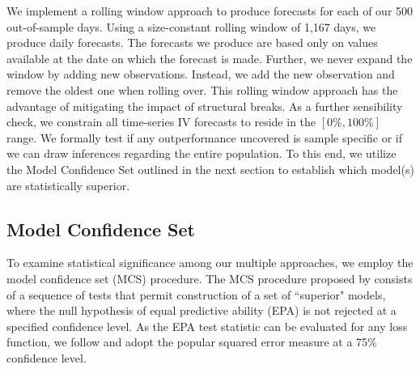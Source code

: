 \documentclass[12pt,a4paper]{article}
\begin{document}
We implement a rolling window approach to produce forecasts for each of our 500 out-of-sample days. Using a size-constant rolling window of 1,167 days, we produce daily forecasts. The forecasts we produce are based only on values available at the date on which the forecast is made. Further, we never expand the window by adding new observations. Instead, we add the new observation and remove the oldest one when rolling over. This rolling window approach has the advantage of mitigating the impact of structural breaks. As a further sensibility check, we constrain all time-series IV forecasts to reside in the $[0\%,100\%]$ range. We formally test if any outperformance uncovered is sample specific or if we can draw inferences regarding the entire population. To this end, we utilize the Model Confidence Set outlined in the next section to establish which model(s) are statistically superior.

\subsection{Model Confidence Set}

To examine statistical significance among our multiple approaches, we employ the model confidence set (MCS) procedure. The MCS procedure proposed by \cite{HLN11} consists of a sequence of tests that permit construction of a set of ``superior" models, where the null hypothesis of equal predictive ability (EPA) is not rejected at a specified confidence level. As the EPA test statistic can be evaluated for any loss function, we follow \cite{HLN11} and adopt the popular squared error measure at a 75\% confidence level.
\end{document}
